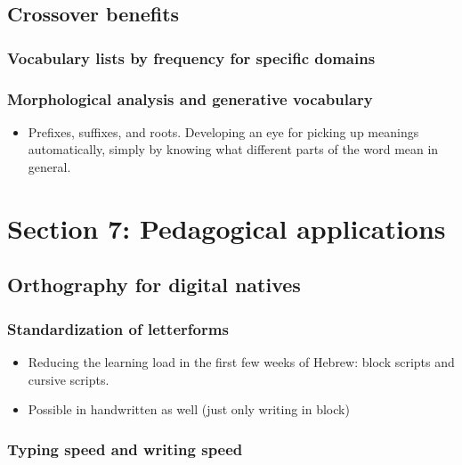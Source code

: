 \documentclass[11pt]{article}
\begin{document}
\subsection{Crossover benefits}
\label{sec:org334c850}

\subsubsection{Vocabulary lists by frequency for specific domains}
\label{sec:org2703083}

\subsubsection{Morphological analysis and generative vocabulary}
\label{sec:org3ea6c02}

\begin{itemize}
\item Prefixes, suffixes, and roots. Developing an eye for picking up meanings automatically, simply by knowing what different parts of the word mean in general.
\end{itemize}

\section{Section 7: Pedagogical applications}
\label{sec:org491f932}

\subsection{Orthography for digital natives}
\label{sec:org8a87b8f}

\subsubsection{Standardization of letterforms}
\label{sec:orgb8eee50}

\begin{itemize}
\item Reducing the learning load in the first few weeks of Hebrew: block scripts and cursive scripts.
\item Possible in handwritten as well (just only writing in block)
\end{itemize}

\subsubsection{Typing speed and writing speed}
\label{sec:orgfd28fe9}
\end{document}
